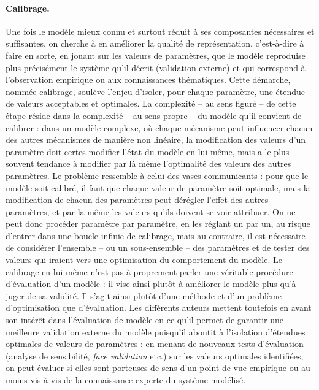 \paragraph{Calibrage.}
Une fois le modèle mieux connu et surtout réduit à ses composantes nécessaires et suffisantes, on cherche à en améliorer la qualité de représentation, c'est-à-dire à faire en sorte, en jouant sur les valeurs de paramètres, que le modèle reproduise plus précisément le système qu'il décrit (validation externe) et qui correspond à l'observation empirique ou aux connaissances thématiques.
Cette démarche, nommée calibrage, soulève l'enjeu d'isoler, pour chaque paramètre, une étendue de valeurs acceptables et optimales.
La complexité -- au sens figuré -- de cette étape réside dans la complexité -- au sens propre -- du modèle qu'il convient de calibrer :
	dans un modèle complexe, où chaque mécanisme peut influencer chacun des autres mécanismes de manière non linéaire, la modification des valeurs d'un paramètre doit certes modifier l'état du modèle en lui-même, mais a le plus souvent tendance à modifier par là même l'optimalité des valeurs des autres paramètres.
Le problème ressemble à celui des vases communicants :
	pour que le modèle soit calibré, il faut que chaque valeur de paramètre soit optimale, mais la modification de chacun des paramètres peut dérégler l'effet des autres paramètres, et par la même les valeurs qu'ils doivent se voir attribuer.
On ne peut donc procéder paramètre par paramètre, en les réglant un par un, au risque d'entrer dans une boucle infinie de calibrage, mais au contraire, il est nécessaire de considérer l'ensemble -- ou un sous-ensemble -- des paramètres et de tester des valeurs qui iraient vers une optimisation du comportement du modèle.
Le calibrage en lui-même n'est pas à proprement parler une véritable procédure d'évaluation d'un modèle :
	il vise ainsi plutôt à \og améliorer\fg{} le modèle plus qu'à juger de sa validité.
Il s'agit ainsi plutôt d'une méthode et d'un problème d'optimisation que d'évaluation.
Les différents auteurs mettent toutefois en avant son intérêt dans l'évaluation de modèle en ce qu'il permet de garantir une meilleure validation externe du modèle puisqu'il aboutit à l'isolation d'étendues optimales de valeurs de paramètres :
	en menant de nouveaux tests d'évaluation (analyse de sensibilité, \textit{face validation} etc.) \autocite[43]{klugl_validation_2008} sur les valeurs optimales identifiées, on peut évaluer si elles sont porteuses de sens d'un point de vue empirique ou au moins vis-à-vis de la connaissance experte du système modélisé.

